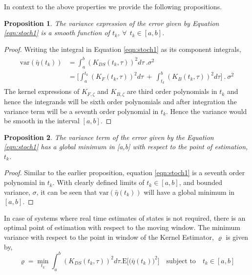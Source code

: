 \documentclass[letterpaper%
, twoside%
, 12pt%
,memoire%
, english%
,creativecommons,hyperref%
]{thETS}
\theoremstyle{newThmStyle}
\newtheorem{proposition}{Proposition}
\begin{document}
In context to the above properties we provide the following propositions.
\begin{proposition}
The variance expression of the error given by Equation \eqref{eqn:stoch1} is a smooth function of $t_k$, $\forall \ \ t_k \in [a, b]$.
\end{proposition}
\begin{proof}
Writing the integral in Equation \eqref{eqn:stoch1} as its component integrals, 
\begin{align*}
\begin{aligned}
\text{var}(\bar{\eta}(t_k)) &= \int_a^b \left(K_{DS}(t_k,\tau)\right)^2 d\tau \ . \sigma^2 \\
&= \bigg[\int_a^{t_k} \left(K_{F}(t_k,\tau)\right)^2 d\tau \ + \ \int_{t_k}^b \left(K_{B}(t_k,\tau)\right)^2 d\tau  \bigg] \ . \ \sigma^2
\end{aligned}
\end{align*}
The kernel expressions of $K_{F,\zeta}$ and $K_{B,\zeta}$ are third order polynomials in $t_k$ and hence the integrands will be sixth order polynomials and after integration the variance term will be a seventh order polynomial in $t_k$. Hence the variance would be smooth in the interval $[a,b]$.
\end{proof}

\begin{proposition}
The variance term of the error given by the Equation \eqref{eqn:stoch1} has a global minimum in [a,b] with respect to the point of estimation, $t_k$.
\end{proposition} 
\begin{proof}
Similar to the earlier proposition, equation \eqref{eqn:stoch1} is a seventh order polynomial in $t_k$. With clearly defined limits of $t_k \in [a,b]$, and bounded variance, $\sigma$, it can be seen that $\text{var}(\bar{\eta}(t_k))$ will have a global minimum in $[a,b]$.
\end{proof}
In case of systems where real time estimates of states is not required, there is an optimal point of estimation with respect to the moving window. The minimum variance with respect to the point in window of the Kernel Estimator, $\varrho$ is given by, 
\begin{equation}
	\varrho = \displaystyle{\min_{t_k}} \int_a^b \left(K_{DS}(t_k,\tau)\right)^2 d\tau . \text{E}\Big[\big( \bar{\eta}(t_k) \big)^2\Big] \quad \text{subject to} \quad  t_k \in [a,b]
\end{equation}
\end{document}
